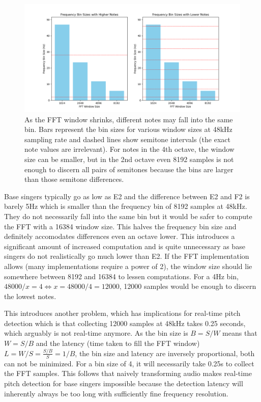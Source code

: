 \begin{figure}[ht]
    \centering
    \includegraphics[width=\textwidth]{./images/fft_bin_size_chart.png}
    \caption{As the FFT window shrinks, different notes may fall into the same bin. Bars represent the bin sizes for various window sizes at 48kHz sampling rate and dashed lines show semitone intervals (the exact note values are irrelevant). For notes in the 4th octave, the window size can be smaller, but in the 2nd octave even 8192 samples is not enough to discern all pairs of semitones because the bins are larger than those semitone differences.\label{fig:fftBinSizeChart}}
\end{figure}

Base singers typically go as low as E2 and the difference between E2 and F2 is barely 5Hz which is smaller than the frequency bin of 8192 samples at 48kHz. They do not necessarily fall into the same bin but it would be safer to compute the FFT with a 16384 window size. This halves the frequency bin size and definitely accomodates differences even an octave lower. This introduces a significant amount of increased computation and is quite unnecessary as base singers do not realistically go much lower than E2. If the FFT implementation allows (many implementations require a power of 2), the window size should lie somewhere between 8192 and 16384 to lessen computations. For a 4Hz bin, $48000/x = 4 \iff x = 48000/4 = 12000$, 12000 samples would be enough to discern the lowest notes. 

This introduces another problem, which has implications for real-time pitch detection which is that collecting 12000 samples at 48kHz takes 0.25 seconds, which arguably is not real-time anymore. As the bin size is $B = S/W$ means that $W = S/B$ and the latency (time taken to fill the FFT window) $L = W/S = \frac{S/B}{S} = 1/B$, the bin size and latency are inversely proportional, both can not be minimized. For a bin size of 4, it will necessarily take 0.25s to collect the FFT samples. This follows that naively transforming audio makes real-time pitch detection for base singers impossible because the detection latency will inherently always be too long with sufficiently fine frequency resolution.

